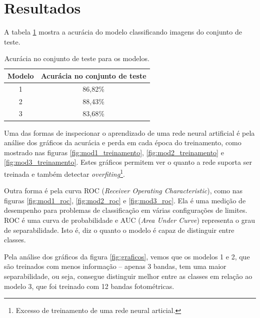 \section{Resultados}

A tabela \ref{tab:eval} mostra a acurácia do modelo classificando imagens do conjunto de teste.

\begin{table}[h!]
  \centering

  \caption{Acurácia no conjunto de teste para os modelos.}
  \label{tab:eval}

  \begin{tabular}{cc}
    \toprule
    Modelo & Acurácia no conjunto de teste \\
    \midrule
    1      & 86,82\%                       \\
    2      & 88,43\%                       \\
    3      & 83,68\%                       \\
    \bottomrule
  \end{tabular}
\end{table}


Uma das formas de inspecionar o aprendizado de uma rede neural artificial é pela análise dos gráficos da acurácia e perda em cada época do treinamento, como mostrado nas figuras \ref{fig:mod1_treinamento}, \ref{fig:mod2_treinamento} e \ref{fig:mod3_treinamento}. Estes gráficos permitem ver o quanto a rede suporta ser treinada e também detectar \emph{overfiting}\footnote{Excesso de treinamento de uma rede neural articial.}.

Outra forma é pela curva ROC (\emph{Receiver Operating Characteristic}), como nas figuras \ref{fig:mod1_roc}, \ref{fig:mod2_roc} e \ref{fig:mod3_roc}. Ela é uma medição de desempenho para problemas de classificação em várias configurações de limites. ROC é uma curva de probabilidade e AUC (\emph{Area Under Curve}) representa o grau de separabilidade. Isto é, diz o quanto o modelo é capaz de distinguir entre classes. \cite{Fawcett2006,Hanley1982}

Pela análise dos gráficos da figura \ref{fig:graficos}, vemos que os modelos 1 e 2, que são treinados com menos informação -- apenas 3 bandas, tem uma maior separabilidade, ou seja, consegue distinguir melhor entre as classes em relação ao modelo 3, que foi treinado com 12 bandas fotométricas.


